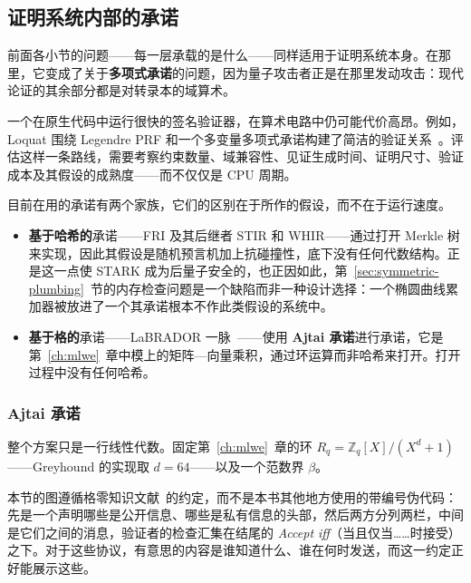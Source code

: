 \subsection{证明系统内部的承诺}
\label{sec:pq-proof-systems}
前面各小节的问题——每一层承载的是什么——同样适用于证明系统本身。在那里，它变成了关于\textbf{多项式承诺}的问题，因为量子攻击者正是在那里发动攻击：现代论证的其余部分都是对转录本的域算术。

一个在原生代码中运行很快的签名验证器，在算术电路中仍可能代价高昂。例如，Loquat 围绕 Legendre PRF 和一个多变量多项式承诺构建了简洁的验证关系~\cite{loquat2024}。评估这样一条路线，需要考察约束数量、域兼容性、见证生成时间、证明尺寸、验证成本及其假设的成熟度——而不仅仅是 CPU 周期。

目前在用的承诺有两个家族，它们的区别在于所作的假设，而不在于运行速度。

\begin{itemize}
  \item \textbf{基于哈希的}承诺——FRI 及其后继者 STIR 和 WHIR——通过打开 Merkle 树来实现，因此其假设是随机预言机加上抗碰撞性，底下没有任何代数结构。正是这一点使 STARK 成为后量子安全的，也正因如此，第~\ref{sec:symmetric-plumbing}~节的内存检查问题是一个缺陷而非一种设计选择：一个椭圆曲线累加器被放进了一个其承诺根本不作此类假设的系统中。
  \item \textbf{基于格的}承诺——LaBRADOR 一脉~\cite{labrador2023}——使用 \textbf{Ajtai 承诺}进行承诺，它是第~\ref{ch:mlwe}~章中模上的矩阵—向量乘积，通过环运算而非哈希来打开。打开过程中没有任何哈希。
\end{itemize}

\subsubsection{Ajtai 承诺}
整个方案只是一行线性代数。固定第~\ref{ch:mlwe}~章的环 $R_q=\mathbb{Z}_q[X]/(X^d+1)$——Greyhound 的实现取 $d=64$——以及一个范数界 $\beta$。

本节的图遵循格零知识文献~\cite{lnp2022}的约定，而不是本书其他地方使用的带编号伪代码：先是一个声明哪些是公开信息、哪些是私有信息的头部，然后两方分列两栏，中间是它们之间的消息，验证者的检查汇集在结尾的 \emph{Accept iff}（当且仅当……时接受）之下。对于这些协议，有意思的内容是谁知道什么、谁在何时发送，而这一约定正好能展示这些。

